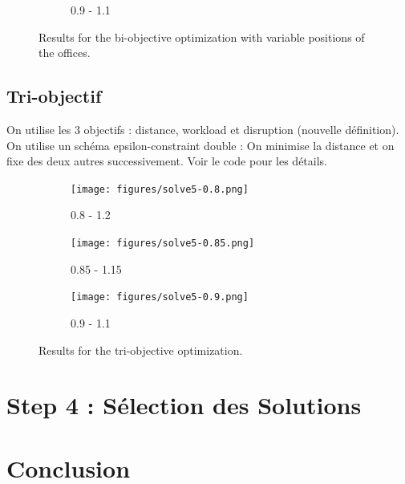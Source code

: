 \documentclass[12pt,a4paper]{article}
\begin{document}
\begin{figure}[H]
\begin{subfigure}{0.32\textwidth}
        \caption{0.9 - 1.1}
        \label{fig:solve3}
    \end{subfigure}
    \caption{Results for the bi-objective optimization with variable positions of the offices.}
    \label{fig:all_solves}
\end{figure}

\subsection*{Tri-objectif}
On utilise les 3 objectifs : distance, workload et disruption (nouvelle définition). On utilise un schéma epsilon-constraint double : On minimise la distance et on fixe des deux autres successivement. Voir le code pour les détails.

\begin{figure}[H]
    \centering
    \begin{subfigure}{0.32\textwidth}
        \centering
        \texttt{[image: figures/solve5-0.8.png]}
        \caption{0.8 - 1.2}
        \label{fig:solve1}
    \end{subfigure}
    \hfill
    \begin{subfigure}{0.32\textwidth}
        \centering
        \texttt{[image: figures/solve5-0.85.png]}
        \caption{0.85 - 1.15}
        \label{fig:solve2}
    \end{subfigure}
    \hfill
    \begin{subfigure}{0.32\textwidth}
        \centering
        \texttt{[image: figures/solve5-0.9.png]}
        \caption{0.9 - 1.1}
        \label{fig:solve3}
    \end{subfigure}
    \caption{Results for the tri-objective optimization.}
    \label{fig:all_solves}
\end{figure}

\section*{Step 4 : Sélection des Solutions}


\section*{Conclusion}
\end{document}

